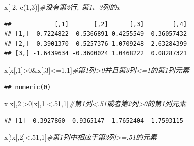\documentclass[
]{book}
\newenvironment{Shaded}{\begin{snugshade}}{\end{snugshade}}
\newcommand{\CommentTok}[1]{\textcolor[rgb]{0.56,0.35,0.01}{\textit{#1}}}
\newcommand{\DecValTok}[1]{\textcolor[rgb]{0.00,0.00,0.81}{#1}}
\newcommand{\FunctionTok}[1]{\textcolor[rgb]{0.00,0.00,0.00}{#1}}
\newcommand{\NormalTok}[1]{#1}
\newcommand{\SpecialCharTok}[1]{\textcolor[rgb]{0.00,0.00,0.00}{#1}}
\begin{document}
\begin{Shaded}
\begin{Highlighting}[]
\NormalTok{x[}\SpecialCharTok{{-}}\DecValTok{2}\NormalTok{,}\SpecialCharTok{{-}}\FunctionTok{c}\NormalTok{(}\DecValTok{1}\NormalTok{,}\DecValTok{3}\NormalTok{)]}\CommentTok{\#没有第2行, 第1、3列的x}
\end{Highlighting}
\end{Shaded}

\begin{verbatim}
##            [,1]       [,2]      [,3]        [,4]
## [1,]  0.7224822 -0.5366891 0.4255549 -0.36057432
## [2,]  0.3901370  0.5257376 1.0709248  2.63284399
## [3,] -1.6439634 -0.3600024 1.0468222  0.08287321
\end{verbatim}

\begin{Shaded}
\begin{Highlighting}[]
\NormalTok{x[x[,}\DecValTok{1}\NormalTok{]}\SpecialCharTok{\textgreater{}}\DecValTok{0}\SpecialCharTok{\&}\NormalTok{x[,}\DecValTok{3}\NormalTok{]}\SpecialCharTok{\textless{}=}\DecValTok{1}\NormalTok{,}\DecValTok{1}\NormalTok{]}\CommentTok{\#第1列\textgreater{}0并且第3列\textless{}=1的第1列元素}
\end{Highlighting}
\end{Shaded}

\begin{verbatim}
## numeric(0)
\end{verbatim}

\begin{Shaded}
\begin{Highlighting}[]
\NormalTok{x[x[,}\DecValTok{2}\NormalTok{]}\SpecialCharTok{\textgreater{}}\DecValTok{0}\SpecialCharTok{|}\NormalTok{x[,}\DecValTok{1}\NormalTok{]}\SpecialCharTok{\textless{}}\NormalTok{.}\DecValTok{51}\NormalTok{,}\DecValTok{1}\NormalTok{]}\CommentTok{\#第1列\textless{}.51或者第2列\textgreater{}0的第1列元素}
\end{Highlighting}
\end{Shaded}

\begin{verbatim}
## [1] -0.3927860 -0.9365147 -1.7652404 -1.7593115
\end{verbatim}

\begin{Shaded}
\begin{Highlighting}[]
\NormalTok{x[}\SpecialCharTok{!}\NormalTok{x[,}\DecValTok{2}\NormalTok{]}\SpecialCharTok{\textless{}}\NormalTok{.}\DecValTok{51}\NormalTok{,}\DecValTok{1}\NormalTok{]}\CommentTok{\#第1列中相应于第2列\textgreater{}=.51的元素}
\end{Highlighting}
\end{Shaded}
\end{document}
